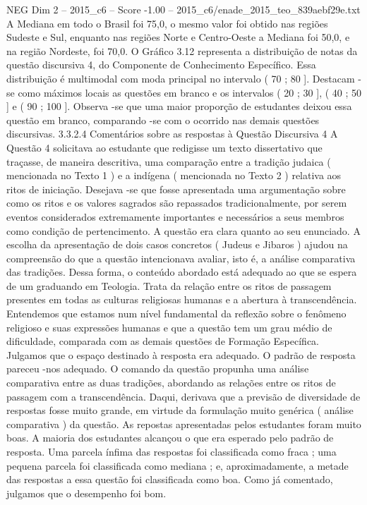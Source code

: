 \begin{textsample}{NEG Dim 2 – 2015\_c6 – Score -1.00 – 2015\_c6/enade\_2015\_teo\_839aebf29e.txt}
A Mediana em todo o Brasil foi 75,0, o mesmo valor foi obtido nas regiões Sudeste e Sul, enquanto nas regiões Norte e Centro-Oeste a Mediana foi 50,0, e na região Nordeste, foi 70,0.
O Gráfico 3.12 representa a distribuição de notas da questão discursiva 4, do Componente de Conhecimento Específico.
Essa distribuição é multimodal com moda principal no intervalo ( 70 ; 80 ].
Destacam -se como máximos locais as questões em branco e os intervalos ( 20 ; 30 ], ( 40 ; 50 ] e ( 90 ; 100 ].
Observa -se que uma maior proporção de estudantes deixou essa questão em branco, comparando -se com o ocorrido nas demais questões discursivas. 3.3.2.4 Comentários sobre as respostas à Questão Discursiva 4 A Questão 4 solicitava ao estudante que redigisse um texto dissertativo que traçasse, de maneira descritiva, uma comparação entre a tradição judaica ( mencionada no Texto 1 ) e a indígena ( mencionada no Texto 2 ) relativa aos ritos de iniciação.
Desejava -se que fosse apresentada uma argumentação sobre como os ritos e os valores sagrados são repassados tradicionalmente, por serem eventos considerados extremamente importantes e necessários a seus membros como condição de pertencimento.
A questão era clara quanto ao seu enunciado.
A escolha da apresentação de dois casos concretos ( Judeus e Jibaros ) ajudou na compreensão do que a questão intencionava avaliar, isto é, a análise comparativa das tradições.
Dessa forma, o conteúdo abordado está adequado ao que se espera de um graduando em Teologia.
Trata da relação entre os ritos de passagem presentes em todas as culturas religiosas humanas e a abertura à transcendência.
Entendemos que estamos num nível fundamental da reflexão sobre o fenômeno religioso e suas expressões humanas e que a questão tem um grau médio de dificuldade, comparada com as demais questões de Formação Específica.
Julgamos que o espaço destinado à resposta era adequado.
O padrão de resposta pareceu -nos adequado.
O comando da questão propunha uma análise comparativa entre as duas tradições, abordando as relações entre os ritos de passagem com a transcendência.
Daqui, derivava que a previsão de diversidade de respostas fosse muito grande, em virtude da formulação muito genérica ( análise comparativa ) da questão.
As repostas apresentadas pelos estudantes foram muito boas.
A maioria dos estudantes alcançou o que era esperado pelo padrão de resposta.
Uma parcela ínfima das respostas foi classificada como fraca ; uma pequena parcela foi classificada como mediana ; e, aproximadamente, a metade das respostas a essa questão foi classificada como boa.
Como já comentado, julgamos que o desempenho foi bom.

\end{textsample}
